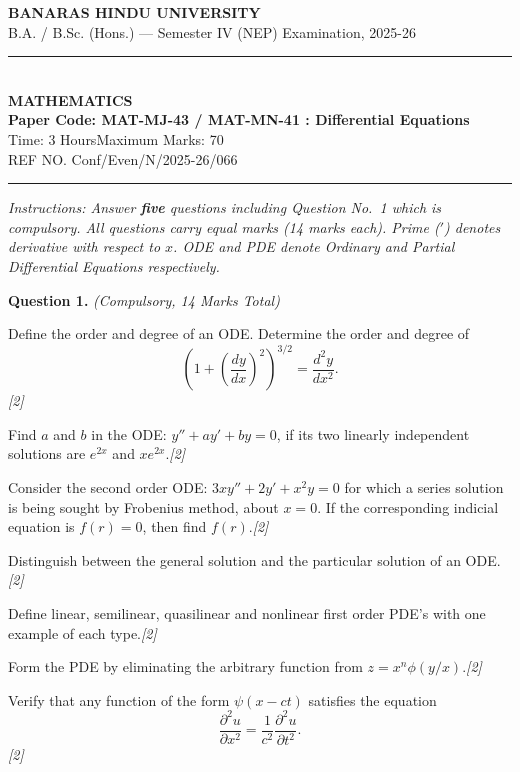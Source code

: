 \documentclass[11pt,a4paper]{article}
\newcommand{\pts}[1]{\hfill   \textit{[#1]}}
\begin{document}
\begin{center}
  {\large\bfseries BANARAS HINDU UNIVERSITY}\\[2pt]
  {\normalsize B.A. / B.Sc. (Hons.) --- Semester IV (NEP) Examination, 2025-26}\\[6pt]
  \rule{0.8\linewidth}{0.5pt}\\[6pt]
  {\large\bfseries MATHEMATICS}\\[4pt]
  {\large\bfseries Paper Code: MAT-MJ-43 / MAT-MN-41 : Differential Equations}\\[4pt]
  {\normalsize Time: 3 Hours\hfill Maximum Marks: 70}\\[2pt]
  {\small REF NO. Conf/Even/N/2025-26/066}
\end{center}

\rule{\linewidth}{0.4pt}

\smallskip



\noindent   \textit{Instructions: Answer   \textbf{five} questions including Question No.~1 which is compulsory. All questions carry equal marks (14 marks each). Prime ($'$) denotes derivative with respect to $x$. ODE and PDE denote Ordinary and Partial Differential Equations respectively.}

\bigskip




\noindent   \textbf{Question 1.}   \textit{(Compulsory, 14 Marks Total)}

\begin{parts}
  \item Define the order and degree of an ODE. Determine the order and degree of
  \[
    \left( 1 + \left( \frac{dy}{dx} \right)^2 \right)^{3/2} = \frac{d^2 y}{dx^2}.
  \]\pts{2}
  \item Find $a$ and $b$ in the ODE: $y'' + ay' + by = 0$, if its two linearly independent solutions are $e^{2x}$ and $x e^{2x}$.\pts{2}
  \item Consider the second order ODE: $3xy'' + 2y' + x^2 y = 0$ for which a series solution is being sought by Frobenius method, about $x = 0$. If the corresponding indicial equation is $f(r) = 0$, then find $f(r)$.\pts{2}
  \item Distinguish between the general solution and the particular solution of an ODE.\pts{2}
  \item Define linear, semilinear, quasilinear and nonlinear first order PDE's with one example of each type.\pts{2}
  \item Form the PDE by eliminating the arbitrary function from $z = x^n \phi(y/x)$.\pts{2}
  \item Verify that any function of the form $\psi(x - ct)$ satisfies the equation
  \[
    \frac{\partial^2 u}{\partial x^2} = \frac{1}{c^2} \frac{\partial^2 u}{\partial t^2}.
  \]\pts{2}
\end{parts}
\end{document}
